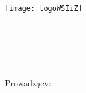 \noindent
\parbox{65mm}{\texttt{[image: logoWSIiZ]}}

\vspace{10mm}
\begin{center}
{\Large{}\textbf{\wydzial}}
\end{center}
\vspace{10mm}
\noindent
\hspace{30mm}{\Large{}\textbf{\kierunek}}\\

\noindent
\hspace{30mm}{\Large{}\textbf{\specjalnosc}}
\vspace{30mm}
\begin{center}
	{\large{}\autor}\\
	{\large{}\album}\\
	\vspace{15pt}
	{\huge{}\textbf{\textit{\temat}}}\\
	\vspace{20pt}
	{\normalsize{}Prowadzący: \promotor}\\
	\vspace{100pt}
	{\LARGE{}\textbf{\typpracy}}\\
	\vspace{190pt}
	{\large{}\textbf{\miasto {} \rok}}
\end{center}

\thispagestyle{empty}

\newpage
\text{}

\thispagestyle{empty}
\newpage


\tableofcontents
\thispagestyle{empty}
\newpage

